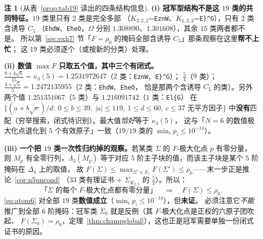 \documentclass[UTF8,11pt]{ctexart}
\theoremstyle{definition}
\newtheorem{remark}[theorem]{注}
\newcommand{\Lam}{\Lambda}
\begin{document}
\begin{remark}[从表~\ref{prop:tab19} 读出的四条结构信息]\label{rmk:tab19read}
\textbf{(i) 冠军型结构不是这 $19$ 类的共同特征。}$19$ 类里只有 $2$ 类是完全多部
（$K_{2,2,2}$=\texttt{EznW}、$K_{1,2,3}$=\texttt{E\}\^{}G}），只有 $2$ 类含诱导 $C_5$
（\texttt{EhdW}、\texttt{EheO}，$\Omega$ 分别 $1.308890$、$1.301608$），其余 $15$ 类两者都不是。
所以第~\ref{sec:exh7} 节「$F=\rho_0$ 的掩码全部含诱导 $C_5$」那条观察在这里\textbf{帮不上忙}；
这 $19$ 类必须逐个（或按新的分类）处理。

\smallskip\textbf{(ii) 数值 $\max F$ 只取五个值，其中三个有闭式。}
$\frac{9+4\sqrt6}{15}=\kappa_3(5)=1.2531972647$（$2$ 类：\texttt{EznW}、\texttt{E\}\^{}G}）；
$\frac54$（$9$ 类）；$\frac{4+\sqrt5}{5}=1.2472135955$（$2$ 类：\texttt{EhdW}、\texttt{EheO}，
恰是那两个含诱导 $C_5$ 的类）。另外两个值 $1.251351067$（$5$ 类）与 $1.216091742$（$1$ 类：\texttt{El\{G}）
在 $\bigl\{(a+b\sqrt c)/d:\ 0\le b\le39,\ |a|\le119,\ 1\le d\le60,\ c\le37\text{ 无平方因子}\bigr\}$
中\textbf{没有}匹配（穷举搜索，闭式待识别）。最大值\emph{恰好}等于 $\kappa_3(5)$，
这与「$N=6$ 的数值极大化点退化到 $5$ 个有效原子」一致（$19/19$ 类的 $\min_ip_i\le10^{-14}$）。

\smallskip\textbf{(iii) 一个把 $19$ 类一次性归约掉的观察。}若某类 $\Sigma$ 的 $F$-极大化点 $p$ 有零分量，
则 $M_p$ 有全零行列，$\Lam_3(M_p)$ 等于对应 $5$ 阶主子块的值，而该主子块是某个 $5$ 阶掩码在 $\Delta_4$ 上的取值，
故 $F(\Sigma)\le\max_{\Sigma'\in\mathcal S_5}F(\Sigma')\le\rho_0$——末一步正是推论~\ref{cor:n5uncond}
（$33$ 类有理证书 $+$ $\Sigma_{K_{2,3}}$ 的 $\frac54$）。所以：
\begin{equation}\label{eq:atom6}
\text{「$\Sigma$ 的每个 $F$-极大化点都有零分量」}\quad\Longrightarrow\quad F(\Sigma)\le\rho_0 .
\end{equation}
\eqref{eq:atom6} 对全部 $19$ 类\textbf{数值成立}（$\min_ip_i\le10^{-14}$），但\textbf{未证}。
必须注意它\emph{不能}推广到全部 $6$ 阶掩码：冠军类 $\Sigma_0$ 就是反例（其 $F$-极大化点是正权的六原子团吹起、
$F(\Sigma_0)=\rho_0$，定理~\ref{thm:champglobal}），这也正是冠军需要单独一份闭式证书的原因。


\end{remark}
\end{document}
